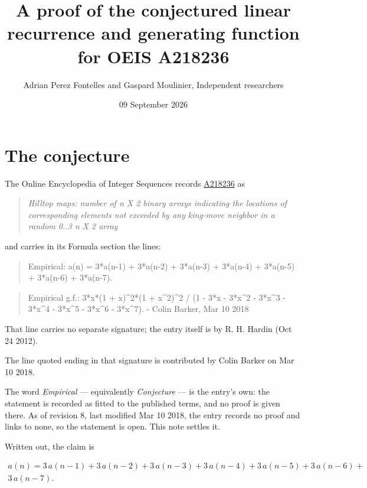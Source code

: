 \documentclass[11pt]{article}
\title{A proof of the conjectured linear recurrence and generating function for OEIS A218236}
\author{Adrian Perez Fontelles and Gaspard Moulinier, Independent researchers}
\date{09 September 2026}
\theoremstyle{definition}
\begin{document}
\maketitle
\section{The conjecture}

The Online Encyclopedia of Integer Sequences records \href{https://oeis.org/A218236}{A218236} as

\begin{quote}\itshape Hilltop maps: number of n X 2 binary arrays indicating the locations of corresponding elements not exceeded by any king-move neighbor in a random 0..3 n X 2 array\end{quote}

and carries in its Formula section the lines:

\begin{quote}\ttfamily Empirical: a(n) = 3*a(n-1) + 3*a(n-2) + 3*a(n-3) + 3*a(n-4) + 3*a(n-5) + 3*a(n-6) + 3*a(n-7).\end{quote}

\begin{quote}\ttfamily Empirical g.f.: 3*x*(1 + x)\textasciicircum{}2*(1 + x\textasciicircum{}2)\textasciicircum{}2 / (1 - 3*x - 3*x\textasciicircum{}2 - 3*x\textasciicircum{}3 - 3*x\textasciicircum{}4 - 3*x\textasciicircum{}5 - 3*x\textasciicircum{}6 - 3*x\textasciicircum{}7). - Colin Barker, Mar 10 2018\end{quote}

That line carries no separate signature; the entry itself is by R. H. Hardin (Oct 24 2012).

The line quoted ending in that signature is contributed by Colin Barker on Mar 10 2018.

The word {\itshape Empirical} --- equivalently {\itshape Conjecture} --- is the entry's own: the statement is recorded as fitted to the published terms, and no proof is given there. As of revision 8, last modified Mar 10 2018, the entry records no proof and links to none, so the statement is open. This note settles it.

Written out, the claim is

\begin{multline*} a(n) = 3\,a(n-1) + 3\,a(n-2) + 3\,a(n-3) + 3\,a(n-4) + 3\,a(n-5) + 3\,a(n-6) + \\ 3\,a(n-7). \end{multline*}
\end{document}
